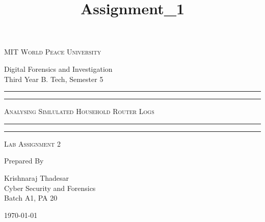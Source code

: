 \documentclass[11pt]{article}
\title{Assignment\_1}
\begin{document}
\begin{titlepage}
    \centering


    \huge\textsc{
        MIT World Peace University
    }\\

    \vspace{0.75\baselineskip} %

    \LARGE{
        Digital Forensics and Investigation\\
        Third Year B. Tech, Semester 5
    }

    \vfill %


    \rule{\textwidth}{1.6pt}\vspace*{-\baselineskip}\vspace*{2pt}
    \rule{\textwidth}{0.6pt}
    \vspace{0.75\baselineskip} %



    \huge{\textsc{
            Analysing Simlulated Household Router Logs
        }} \\



    \vspace{0.5\baselineskip} %
    \rule{\textwidth}{0.6pt}\vspace*{-\baselineskip}\vspace*{2.8pt}
    \rule{\textwidth}{1.6pt}

    \vspace{1\baselineskip} %


    \LARGE\textsc{
        Lab Assignment 2
    } %
    \vfill


    Prepared By
    \vspace{0.5\baselineskip} %

    \Large{
        Krishnaraj Thadesar \\
        Cyber Security and Forensics\\
        Batch A1, PA 20
    }


    \vspace{0.5\baselineskip} %
    \today

\end{titlepage}
\end{document}
